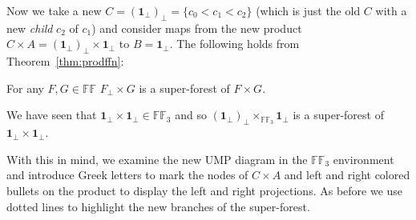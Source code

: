 \newpage
Now we take a new $C = (\textbf{1}_\bot)_\bot = \{c_0 < c_1 < c_2\}$ (which is just the old $C$ with a new \emph{child} $c_2$ of $c_1$) and consider maps from the new product $C \times A = (\textbf{1}_\bot)_\bot \times \textbf{1}_\bot$ to $B = \textbf{1}_\bot$.\newline
The following holds from Theorem~\ref{thm:prodffn}:
\begin{lem}
	For any $F,G \in \mathbb{FF}$ $F_\bot \times G$ is a super-forest of $F \times G$. 
\end{lem}
\begin{remark}
	We have seen that $\textbf{1}_\bot \times \textbf{1}_\bot \in \mathbb{FF}_3$ and so
	 $(\textbf{1}_\bot)_\bot \times_{\mathbb{FF}_3} \textbf{1}_\bot$ is a super-forest of $\textbf{1}_\bot \times \textbf{1}_\bot$.
\end{remark}
With this in mind, we examine the new UMP diagram in the $\mathbb{FF}_3$ environment
and introduce Greek letters to mark the nodes of $C \times A$ and left and right colored bullets
on the product to display the left and right projections. As before we use dotted lines to highlight the new branches of the super-forest.  
